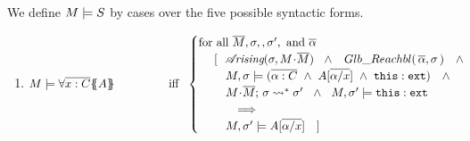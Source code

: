 \begin{definition}%

We define $M \models {S}$ by cases over the five possible syntactic forms.

\label{def:necessity-semantics}

\begin{enumerate}
 \item
 $\satisfies{M}{\TwoStatesN {\overline {x:C}} {A}} \  \ \ \ \ \ \ \ \ \ \ \ \ \ \mbox{iff}  \   \
    \begin{cases}
     \mbox{for all }   \Mtwo,  \sigma, , \sigma', \mbox{ and }  \overline{\alpha}    \\
 \ \ \ \  [ \ \ { \arising{\sigma}{M\madd \Mtwo }\   \  \wedge\ \ \GRelevant {\overline \alpha}  \sigma}\ \ \ \wedge  \\
  \ \ \ \  \ \ \  \satisfiesA {M}   {\sigma}  {(\overline {\alpha :C} \ \wedge\  {A[\overline{\alpha/x}]}\ \wedge \  {\external{\prg{this}}}) } \ \ \ \wedge   \\
 \ \ \ \   \ \ \ {\leadstoBoundedStar {M\madd \Mtwo}{\sigma}  {\sigma'} } \ \ \wedge\ \  M, \sigma' \models {\external{\prg{this}}}  \\
 \ \ \ \   \ \ \ \ \  \ \Longrightarrow   \\
 \ \ \ \   \ \ \  {\satisfiesA{M}{\sigma'}{ A[\overline{\alpha/x}]}  }  \ \ \  ]  
     \end{cases} 
 $

\end{enumerate}
\end{definition}
